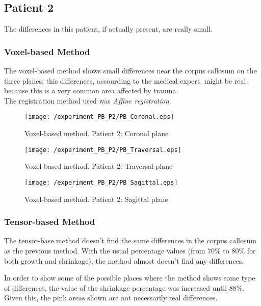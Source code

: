 \subsection{Patient 2}
The differences in this patient, if actually present, are really
small. 

\subsubsection{Voxel-based Method}
The voxel-based method shows small differences near the corpus
callosum on the three planes; this differences, accourding to the
medical expert, might be real because this is a very common area
affected by trauma.\\

The registration method used was \textit{Affine registration}.

\begin{figure}[H]
  \centering
  \texttt{[image: /experiment\_PB\_P2/PB\_Coronal.eps]}
  \caption{Voxel-based method. Patient 2: Coronal plane}
  \label{PB_Coronal}
\end{figure}

\begin{figure}[H]
  \centering
  \texttt{[image: /experiment\_PB\_P2/PB\_Traversal.eps]}
  \caption{Voxel-based method. Patient 2: Traversal plane}
  \label{PB_Traversal}
\end{figure}

\begin{figure}[H]
  \centering
  \texttt{[image: /experiment\_PB\_P2/PB\_Sagittal.eps]}
  \caption{Voxel-based method. Patient 2: Sagittal plane}
  \label{PB_Sagittal}
\end{figure}


\subsubsection{Tensor-based Method}
The tensor-base method doesn't find the same differences in the corpus
callosum as the previous method. With the usual percentage values
(from $70\%$ to $80\%$ for both growth and shrinkage), the method almost
doesn't find any differences. 

In order to show some of the possible places where the method shows
some type of differences, the value of the shrinkage percentage was
increased until $88\%$. Given this, the pink areas shown are not
necessarily real differences.\\

